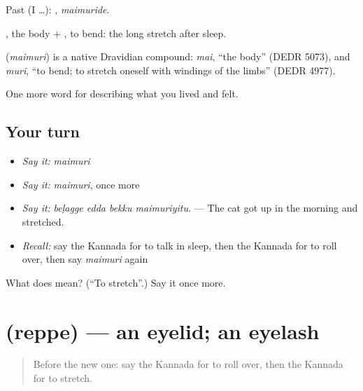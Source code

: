 Past (I …): , \emph{maimuride}.

, the body + , to bend: the long stretch after sleep.

\begin{cousinweb}
\textbf{} (\emph{maimuri}) is a native Dravidian compound: \emph{mai}, \textquotedblleft{}the body\textquotedblright{} (DEDR 5073), and \emph{muri}, \textquotedblleft{}to bend; to stretch oneself with windings of the limbs\textquotedblright{} (DEDR 4977).
\end{cousinweb}

\begin{grammarlens}[title={What you've built}]
One more word for describing what you lived and felt.
\end{grammarlens}

\subsection*{Your turn}
\begin{itemize}
\raggedright
  \item \emph{Say it:} \emph{maimuri}
  \item \emph{Say it:} \emph{maimuri}, once more
  \item \emph{Say it:} \emph{beḷagge edda bekku maimuriyitu.} — The cat got up in the morning and stretched.
  \item \emph{Recall:} say the Kannada for to talk in sleep, then the Kannada for to roll over, then say \emph{maimuri} again
\end{itemize}

\begin{tcolorbox}[breakable,colback=teal!4,colframe=teal!35!black,title={Before you move on}]
What does  mean? (\textquotedblleft{}To stretch\textquotedblright{}.) Say it once more.
\end{tcolorbox}
\section[\texorpdfstring{\kn{ರೆಪ್ಪೆ} (reppe)}{ರೆಪ್ಪೆ (reppe)}]{ (reppe) — an eyelid; an eyelash}

\label{lesson:KA-C506-reppe}



\begin{quote}
Before the new one: say the Kannada for to roll over, then the Kannada for to stretch.
\end{quote}


